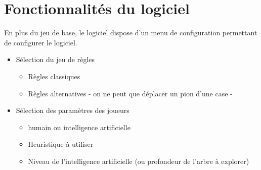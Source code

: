 \chapter{Fonctionnalités du logiciel}

En plus du jeu de base, le logiciel dispose d'un menu de configuration
permettant de configurer le logiciel.

\begin{itemize}
    \item Sélection du jeu de règles
    \begin{itemize}
        \item Règles classiques
        \item Règles alternatives - on ne peut que déplacer un pion d'une case -
    \end{itemize}
    \item Sélection des paramètres des joueurs
    \begin{itemize}
        \item humain ou intelligence artificielle
        \item Heuristique à utiliser
        \item Niveau de l'intelligence artificielle (ou profondeur de
        l'arbre à explorer)
    \end{itemize}
\end{itemize}
